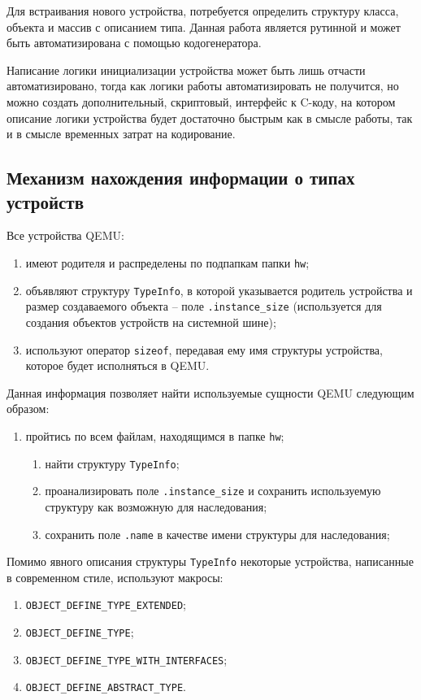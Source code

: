 Для встраивания нового устройства, потребуется определить структуру класса, объекта и массив с описанием
типа. Данная работа является рутинной и может быть автоматизирована с помощью кодогенератора.

Написание логики инициализации устройства может быть лишь отчасти автоматизировано, тогда как
логики работы автоматизировать не получится, но можно создать дополнительный, скриптовый,
интерфейс к C-коду, на котором описание логики устройства будет достаточно быстрым как
в смысле работы, так и в смысле временных затрат на кодирование.

\subsection{Механизм нахождения информации о типах устройств}\label{sec:ch2/sec2/sub2/sub5}

Все устройства QEMU:
\begin{enumerate}[label={\arabic*)}]
    \item имеют родителя и распределены по подпапкам папки \texttt{hw};
    \item объявляют структуру \texttt{TypeInfo}, в которой указывается родитель устройства
          и размер создаваемого объекта -- поле \texttt{.instance\_size}
          (используется для создания объектов устройств на системной шине);
    \item используют оператор \texttt{sizeof},
          передавая ему имя структуры устройства, которое будет исполняться в QEMU.
\end{enumerate}

Данная информация позволяет найти используемые сущности QEMU следующим образом:
\begin{enumerate}[label={\arabic*)}]
    \item пройтись по всем файлам, находящимся в папке \texttt{hw};
    \begin{enumerate}[label={\arabic*)}]
        \item найти структуру \texttt{TypeInfo};
        \item проанализировать поле \texttt{.instance\_size} и сохранить
              используемую структуру как возможную для наследования;
        \item сохранить поле \texttt{.name} в качестве имени структуры для наследования;
    \end{enumerate}
\end{enumerate}

Помимо явного описания структуры \texttt{TypeInfo} некоторые устройства, написанные
в современном стиле, используют макросы:
\begin{enumerate}[label={\arabic*)}]
    \item \label{main-def-macro} \texttt{OBJECT\_DEFINE\_TYPE\_EXTENDED};
    \item \texttt{OBJECT\_DEFINE\_TYPE};
    \item \texttt{OBJECT\_DEFINE\_TYPE\_WITH\_INTERFACES};
    \item \texttt{OBJECT\_DEFINE\_ABSTRACT\_TYPE}.
\end{enumerate}

